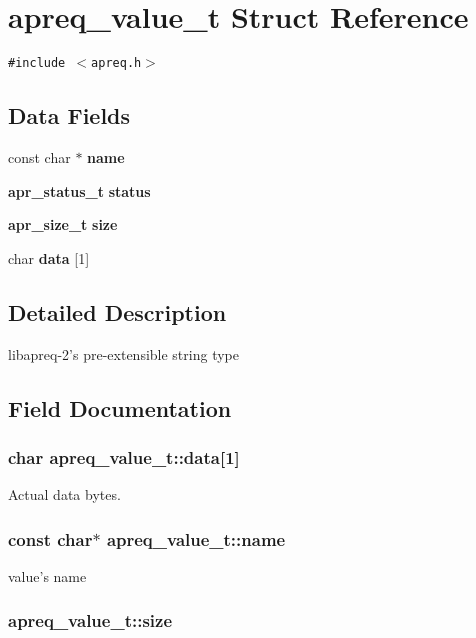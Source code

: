 \section{apreq\_\-value\_\-t  Struct Reference}
\label{structapreq__value__t}
{\tt \#include $<$apreq.h$>$}

\subsection*{Data Fields}
\begin{CompactItemize}
\item 
const char $\ast$ {\bf name}
\item 
{\bf apr\_\-status\_\-t} {\bf status}
\item 
{\bf apr\_\-size\_\-t} {\bf size}
\item 
char {\bf data} [1]
\end{CompactItemize}


\subsection{Detailed Description}
libapreq-2's pre-extensible string type 



\subsection{Field Documentation}
\subsubsection{\setlength{\rightskip}{0pt plus 5cm}char apreq\_\-value\_\-t::data[1]}\label{structapreq__value__t_m3}


Actual data bytes. 
\subsubsection{\setlength{\rightskip}{0pt plus 5cm}const char$\ast$ apreq\_\-value\_\-t::name}\label{structapreq__value__t_m0}


value's name 
\subsubsection{ apreq\_\-value\_\-t::size}\label{structapreq__value__t_m2}


